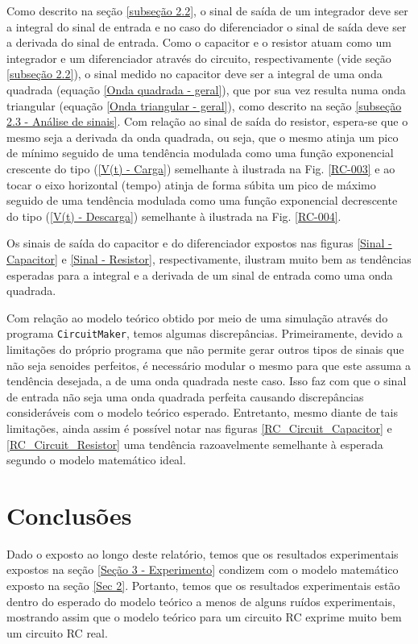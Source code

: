 \documentclass[letterpaper, 12pt]{article}
\begin{document}
Como descrito na seção \ref{subseção 2.2}, o sinal de saída de um integrador deve ser a integral do sinal de entrada e no caso do diferenciador o sinal de saída deve ser a derivada do sinal de entrada. Como o capacitor e o resistor atuam como um integrador e um diferenciador através do circuito, respectivamente (vide seção \ref{subseção 2.2}), o sinal medido no capacitor deve ser a integral de uma onda quadrada (equação \ref{Onda quadrada - geral}), que por sua vez resulta numa onda triangular (equação \ref{Onda triangular - geral}), como descrito na seção \ref{subseção 2.3 - Análise de sinais}. Com relação ao sinal de saída do resistor, espera-se que o mesmo seja a derivada da onda quadrada, ou seja, que o mesmo atinja um pico de mínimo seguido de uma tendência modulada como uma função exponencial crescente do tipo (\ref{V(t) - Carga}) semelhante à ilustrada na Fig. \ref{RC-003} e ao tocar o eixo horizontal (tempo) atinja de forma súbita um pico de máximo seguido de uma tendência modulada como uma função exponencial decrescente do tipo (\ref{V(t) - Descarga}) semelhante à ilustrada na Fig. \ref{RC-004}.

Os sinais de saída do capacitor e do diferenciador expostos nas figuras \ref{Sinal - Capacitor} e \ref{Sinal - Resistor}, respectivamente, ilustram muito bem as tendências esperadas para a integral e a derivada de um sinal de entrada como uma onda quadrada.

Com relação ao modelo teórico obtido por meio de uma simulação através do programa \texttt{CircuitMaker}, temos algumas discrepâncias. Primeiramente, devido a limitações do próprio programa que não permite gerar outros tipos de sinais que não seja senoides perfeitos, é necessário modular o mesmo para que este assuma a tendência desejada, a de uma onda quadrada neste caso. Isso faz com que o sinal de entrada não seja uma onda quadrada perfeita causando discrepâncias consideráveis com o modelo teórico esperado. Entretanto, mesmo diante de tais limitações, ainda assim é possível notar nas figuras \ref{RC_Circuit_Capacitor} e \ref{RC_Circuit_Resistor} uma tendência razoavelmente semelhante à esperada segundo o modelo matemático ideal. 


\section{Conclusões}
Dado o exposto ao longo deste relatório, temos que os resultados experimentais expostos na seção \ref{Seção 3 - Experimento} condizem com o modelo matemático exposto na seção \ref{Sec 2}. Portanto, temos que os resultados experimentais estão dentro do esperado do modelo teórico a menos de alguns ruídos experimentais, mostrando assim que o modelo teórico para um circuito RC exprime muito bem um circuito RC real.
\end{document}

